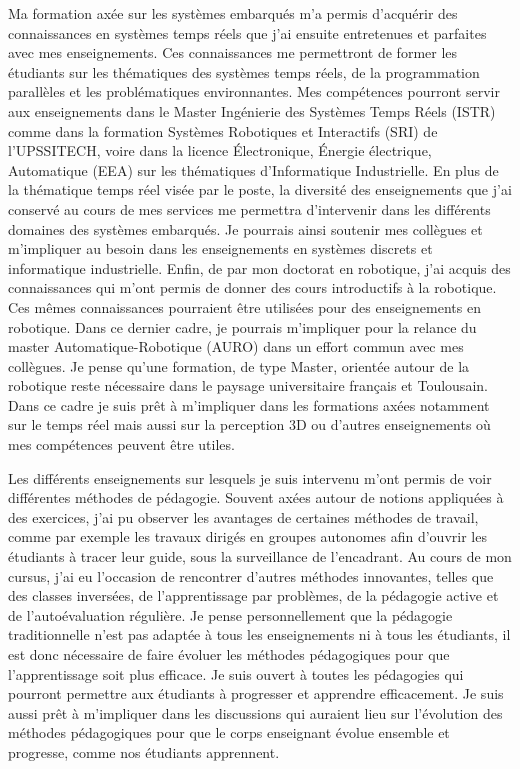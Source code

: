 \documentclass[11pt,a4paper,sans]{moderncv}         %
\begin{document}
Ma formation axée sur les systèmes embarqués m'a permis d'acquérir des connaissances en systèmes temps réels que j'ai ensuite entretenues et parfaites avec mes enseignements. Ces connaissances me permettront de former les étudiants sur les thématiques des systèmes temps réels, de la programmation parallèles et les problématiques environnantes. Mes compétences pourront servir aux enseignements dans le Master Ingénierie des Systèmes Temps Réels (ISTR) comme dans la formation Systèmes Robotiques et Interactifs (SRI) de l'UPSSITECH, voire dans la licence Électronique, Énergie électrique, Automatique (EEA) sur les thématiques d'Informatique Industrielle. En plus de la thématique temps réel visée par le poste, la diversité des enseignements que j'ai conservé au cours de mes services me permettra d'intervenir dans les différents domaines des systèmes embarqués. Je pourrais ainsi soutenir mes collègues et m'impliquer au besoin dans les enseignements en systèmes discrets et informatique industrielle. Enfin, de par mon doctorat en robotique, j'ai acquis des connaissances qui m'ont permis de donner des cours introductifs à la robotique. Ces mêmes connaissances pourraient être utilisées pour des enseignements en robotique. Dans ce dernier cadre, je pourrais m'impliquer pour la relance du master Automatique-Robotique (AURO) dans un effort commun avec mes collègues. Je pense qu'une formation, de type Master, orientée autour de la robotique reste nécessaire dans le paysage universitaire français et Toulousain. Dans ce cadre je suis prêt à m'impliquer dans les formations axées notamment sur le temps réel mais aussi sur la perception 3D ou d'autres enseignements où mes compétences peuvent être utiles.

Les différents enseignements sur lesquels je suis intervenu m'ont permis de voir différentes méthodes de pédagogie. Souvent axées autour de notions appliquées à des exercices, j'ai pu observer les avantages de certaines méthodes de travail, comme par exemple les travaux dirigés en groupes autonomes afin d'ouvrir les étudiants à tracer leur guide, sous la surveillance de l'encadrant. Au cours de mon cursus, j'ai eu l'occasion de rencontrer d'autres méthodes innovantes, telles que des classes inversées, de l'apprentissage par problèmes, de la pédagogie active et de l'autoévaluation régulière. Je pense personnellement que la pédagogie traditionnelle n'est pas adaptée à tous les enseignements ni à tous les étudiants, il est donc nécessaire de faire évoluer les méthodes pédagogiques pour que l'apprentissage soit plus efficace. Je suis ouvert à toutes les pédagogies qui pourront permettre aux étudiants à progresser et apprendre efficacement. Je suis aussi prêt à m'impliquer dans les discussions qui auraient lieu sur l'évolution des méthodes pédagogiques pour que le corps enseignant évolue ensemble et progresse, comme nos étudiants apprennent.
\end{document}
